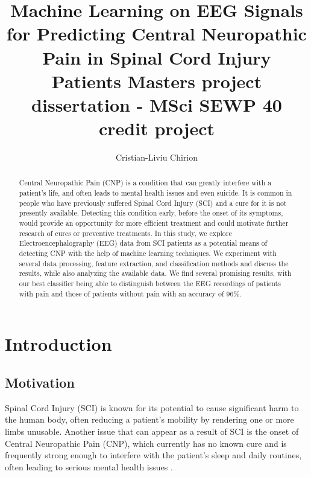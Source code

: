 \documentclass{mpaper}
\begin{document}
\title{Machine Learning on EEG Signals for Predicting Central Neuropathic Pain in Spinal Cord Injury Patients \newline \large{Masters project dissertation - MSci SEWP 40 credit project}}
\author{Cristian-Liviu Chirion}


\maketitle

\begin{abstract}
Central Neuropathic Pain (CNP) is a condition that can greatly interfere with a patient's life, and often leads to mental health issues and even suicide. It is common in people who have previously suffered Spinal Cord Injury (SCI) and a cure for it is not presently available. Detecting this condition early, before the onset of its symptoms, would provide an opportunity for more efficient treatment and could motivate further research of cures or preventive treatments. In this study, we explore Electroencephalography (EEG) data from SCI patients as a potential means of detecting CNP with the help of machine learning techniques. We experiment with several data processing, feature extraction, and classification methods and discuss the results, while also analyzing the available data. We find several promising results, with our best classifier being able to distinguish between the EEG recordings of patients with pain and those of patients without pain with an accuracy of 96\%. 
\end{abstract}

\section{Introduction}

\subsection{Motivation}

Spinal Cord Injury (SCI) is known for its potential to cause significant harm to the human body, often reducing a patient's mobility by rendering one or more limbs unusable. Another issue that can appear as a result of SCI is the onset of Central Neuropathic Pain (CNP), which currently has no known cure and is frequently strong enough to interfere with the patient's sleep and daily routines, often leading to serious mental health issues {\cite{hulsebosch_mechanisms_2009}}.
\end{document}
